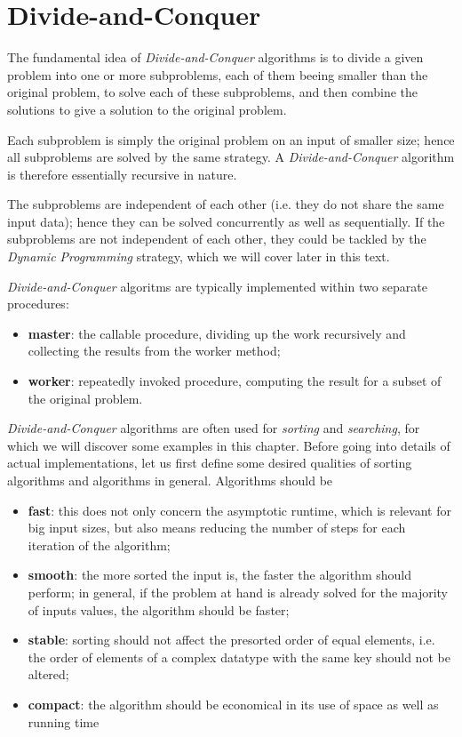 \chapter{Divide-and-Conquer}

The fundamental idea of \emph{Divide-and-Conquer} algorithms is to divide a given problem into one or more subproblems, each of them beeing smaller than the original problem, to solve each of these subproblems, and then combine the solutions to give a solution to the original problem.

Each subproblem is simply the original problem on an input of smaller size; hence all subproblems are solved by the same strategy. A \emph{Divide-and-Conquer} algorithm is therefore essentially recursive in nature.

The subproblems are independent of each other (i.e. they do not share the same input data); hence they can be solved concurrently as well as sequentially. If the subproblems are not independent of each other, they could be tackled by the \emph{Dynamic Programming} strategy, which we will cover later in this text.

\emph{Divide-and-Conquer} algoritms are typically implemented within two separate procedures:
\begin{itemize}
\item \textbf{master}: the callable procedure, dividing up the work recursively and collecting the results from the worker method;
\item \textbf{worker}: repeatedly invoked procedure, computing the result for a subset of the original problem.
\end{itemize}

\emph{Divide-and-Conquer} algorithms are often used for \emph{sorting} and \emph{searching}, for which we will discover some examples in this chapter.
Before going into details of actual implementations, let us first define some desired qualities of sorting algorithms and algorithms in general. Algorithms should be
\begin{itemize}
\item \textbf{fast}: this does not only concern the asymptotic runtime, which is relevant for big input sizes, but also means reducing the number of steps for each iteration of the algorithm; 
\item \textbf{smooth}: the more sorted the input is, the faster the algorithm should perform; in general, if the problem at hand is already solved for the majority of inputs values, the algorithm should be faster;
\item \textbf{stable}: sorting should not affect the presorted order of equal elements, i.e. the order of elements of a complex datatype with the same key should not be altered;
\item \textbf{compact}: the algorithm should be economical in its use of space as well as running time
\end{itemize}

